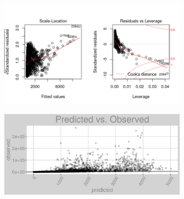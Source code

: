 \begin{figure}[h]
\centering
\begin{subfigure}{1\textwidth}
\centering
\includegraphics[width=.99\textwidth, height=0.475\textheight]{Images/electricity_rf_res_2.png}
\end{subfigure}
\begin{subfigure}{1\textwidth}
\centering
\includegraphics[width=.99\textwidth, height=0.3\textheight]{Images/electricity_rf_pvo.png}
\end{subfigure}
\end{figure}
\newpage
